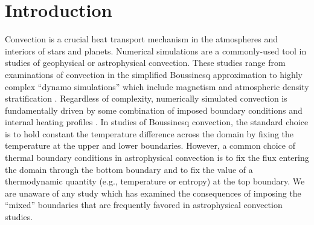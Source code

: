 \documentclass[aps, pre, onecolumn, nofootinbib, notitlepage, groupedaddress, amsfonts, amssymb, amsmath, longbibliography, superscriptaddress]{revtex4-1}
\begin{document}

\section{Introduction}
\label{sec:introduction}
Convection is a crucial heat transport mechanism in the atmospheres and interiors of stars and planets.
Numerical simulations are a commonly-used tool in studies of geophysical or astrophysical convection.
These studies range from examinations of convection in the simplified Boussinesq approximation \cite{spiegel&veronis1960, ahlers&all2009, plumley&julien2019} to highly complex ``dynamo simulations'' which include magnetism and atmospheric density stratification \cite{charbonneau2014, toomre2019}.
Regardless of complexity, numerically simulated convection is fundamentally driven by some combination of imposed boundary conditions and internal heating profiles \cite{goluskin2016}.
In studies of Boussinesq convection, the standard choice is to hold constant the temperature difference across the domain by fixing the temperature at the upper and lower boundaries.
However, a common choice of thermal boundary conditions in astrophysical convection \cite{glatzmaier&gilman1982, hurlburt&all1986, cattaneo&all1990, featherstone&hindman2016a, korre&all2019, wood&brummell2018, kapyla&all2019} is to fix the flux entering the domain through the bottom boundary and to fix the value of a thermodynamic quantity (e.g., temperature or entropy) at the top boundary.
We are unaware of any study which has examined the consequences of imposing the ``mixed'' boundaries that are frequently favored in astrophysical convection studies.
\end{document}
